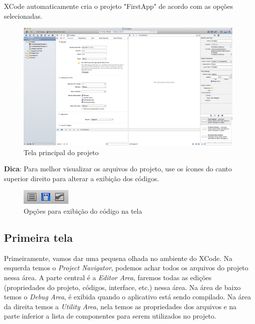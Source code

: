 \documentclass[a4paper,12pt,brazil,doubleside]{book}
\begin{document}
\begin{singlespace}
XCode automaticamente cria o projeto "FirstApp" de acordo com as opções selecionadas.

\begin{figure}[H]
  \centering
  \includegraphics[width=.99\textwidth]{figuras/3/tela_novo_projeto_4.png}
  \caption{Tela principal do projeto}
  \label{fig:a}
\end{figure}

\begin{framed}

\textbf{Dica}: Para melhor visualizar os arquivos do projeto, use os ícones do canto superior direito para alterar a exibição dos códigos.
\end{framed}

\begin{figure}[H]
  \centering
  \includegraphics[scale=1]{figuras/3/tela_opcao_exibicao.png}
  \caption{Opções para exibição do código na tela}
  \label{fig:a}
\end{figure}

\subsection{Primeira tela}


Primeiramente, vamos dar uma pequena olhada no ambiente do XCode. Na esquerda temos o \emph{Project Navigator}, podemos achar todos os arquivos do projeto nessa área. A parte central é a \emph{Editor Area}, faremos todas as edições (propriedades do projeto, códigos, interface, etc.) nessa área. Na área de baixo temos o \emph{Debug Area}, é exibida quando o aplicativo está sendo compilado. Na área da direita temos a \emph{Utility Area}, nela temos as propriedades dos arquivos e na parte inferior a lista de componentes para serem utilizados no projeto.


\end{singlespace}
\end{document}
